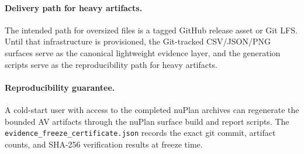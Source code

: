 \paragraph{Delivery path for heavy artifacts.}
The intended path for oversized files is a tagged GitHub release asset or Git LFS.
Until that infrastructure is provisioned, the Git-tracked CSV/JSON/PNG surfaces
serve as the canonical lightweight evidence layer, and the generation scripts serve
as the reproducibility path for heavy artifacts.

\paragraph{Reproducibility guarantee.}
A cold-start user with access to the completed nuPlan archives can regenerate the
bounded AV artifacts through the nuPlan surface build and report scripts.  The
\texttt{evidence\_freeze\_certificate.json} records the exact git commit, artifact
counts, and SHA-256 verification results at freeze time.
